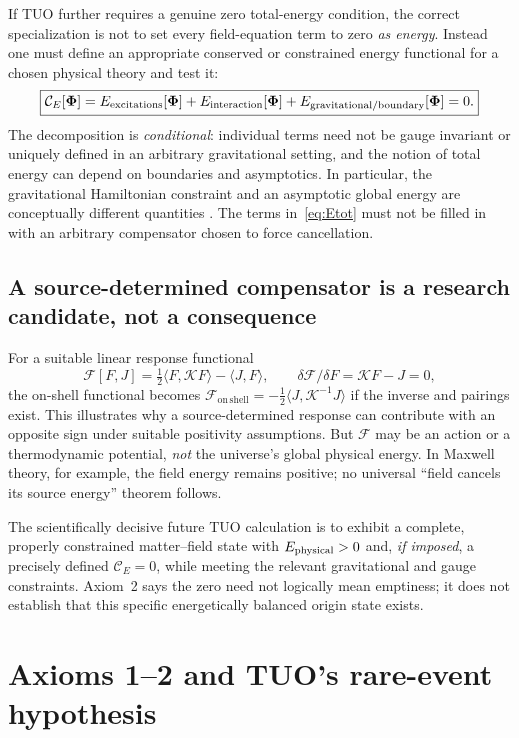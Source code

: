 \documentclass[11pt,a4paper]{article}
\newcommand{\cC}{\mathcal C}
\newcommand{\cF}{\mathcal F}
\newcommand{\ave}[1]{\langle #1\rangle}
\newcommand{\on}{\mathrm{on\,shell}}
\theoremstyle{tmon}
\theoremstyle{definition}
\begin{document}
If TUO further requires a genuine zero total-energy condition, the correct specialization is not to set every field-equation term to zero \emph{as energy}. Instead one must define an appropriate conserved or constrained energy functional for a chosen physical theory and test it:
\begin{equation}\label{eq:Etot}
\boxed{\cC_E[\bm\Phi]
=E_{\rm excitations}[\bm\Phi]
+E_{\rm interaction}[\bm\Phi]
+E_{\rm gravitational/boundary}[\bm\Phi]=0.}
\end{equation}
The decomposition is \emph{conditional}: individual terms need not be gauge invariant or uniquely defined in an arbitrary gravitational setting, and the notion of total energy can depend on boundaries and asymptotics. In particular, the gravitational Hamiltonian constraint and an asymptotic global energy are conceptually different quantities \cite{Wald1984}. The terms in~\eqref{eq:Etot} must not be filled in with an arbitrary compensator chosen to force cancellation.

\subsection{A source-determined compensator is a research candidate, not a consequence}
For a suitable linear response functional
\begin{equation}
\cF[F,J]=\tfrac12\ave{F,\mathcal KF}-\ave{J,F},\qquad
\delta\cF/\delta F=\mathcal KF-J=0,
\end{equation}
the on-shell functional becomes $\cF_{\on}=-\tfrac12\ave{J,\mathcal K^{-1}J}$ if the inverse and pairings exist. This illustrates why a source-determined response can contribute with an opposite sign under suitable positivity assumptions. But $\cF$ may be an action or a thermodynamic potential, \emph{not} the universe's global physical energy. In Maxwell theory, for example, the field energy remains positive; no universal ``field cancels its source energy'' theorem follows.

The scientifically decisive future TUO calculation is to exhibit a complete, properly constrained matter--field state with $E_{\rm physical}>0$ and, \emph{if imposed}, a precisely defined $\cC_E=0$, while meeting the relevant gravitational and gauge constraints. Axiom~2 says the zero need not logically mean emptiness; it does not establish that this specific energetically balanced origin state exists.

\section{Axioms 1--2 and TUO's rare-event hypothesis}
\end{document}
